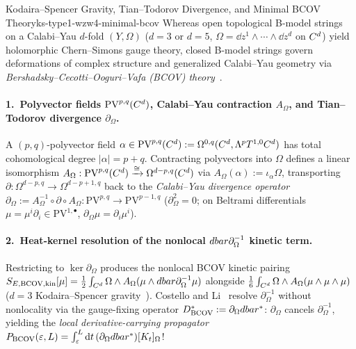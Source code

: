 \begin{zkmodule}{Kodaira--Spencer Gravity, Tian--Todorov Divergence, and Minimal BCOV Theory}{ks-type1-wzw4-minimal-bcov}
Whereas open topological B-model strings on a Calabi--Yau $d$-fold $(Y,\Omega)$ ($d=3$ or $d=5$, $\Omega = \dd z^1\wedge\cdots\wedge\dd z^d$ on $C^d$) yield holomorphic Chern--Simons gauge theory, closed B-model strings govern deformations of complex structure and generalized Calabi--Yau geometry via \emph{Bershadsky--Cecotti--Ooguri--Vafa (BCOV) theory}~\cite{BCOV94,CL19}.

\paragraph{1.\ Polyvector fields $\mathrm{PV}^{p,q}(C^d)$, Calabi--Yau contraction $A_\Omega$, and Tian--Todorov divergence $\partial_\Omega$.}
A $(p,q)$-polyvector field $\alpha \in \mathrm{PV}^{p,q}(C^d) := \Omega^{0,q}(C^d, \Lambda^p T^{1,0}C^d)$ has total cohomological degree $|\alpha| = p + q$. Contracting polyvectors into $\Omega$ defines a linear isomorphism $A_\Omega : \mathrm{PV}^{p,q}(C^d) \xrightarrow{\cong} \Omega^{d-p,q}(C^d)$ via $A_\Omega(\alpha) := \iota_\alpha\Omega$, transporting $\partial : \Omega^{d-p,q} \to \Omega^{d-p+1,q}$ back to the \emph{Calabi--Yau divergence operator} $\partial_\Omega := A_\Omega^{-1}\circ\partial\circ A_\Omega : \mathrm{PV}^{p,q} \to \mathrm{PV}^{p-1,q}$ ($\partial_\Omega^2 = 0$; on Beltrami differentials $\mu = \mu^i\partial_i \in \mathrm{PV}^{1,\bullet}$, $\partial_\Omega\mu = \partial_i\mu^i$).

\paragraph{2.\ Heat-kernel resolution of the nonlocal $dbar\partial_\Omega^{-1}$ kinetic term.}
Restricting to $\ker\partial_\Omega$ produces the nonlocal BCOV kinetic pairing $S_{E,\mathrm{BCOV,kin}}[\mu] = \frac{1}{2}\int_{C^d}\Omega\wedge A_\Omega(\mu\wedge dbar\partial_\Omega^{-1}\mu)$ alongside $\frac{1}{6}\int_{C^d}\Omega\wedge A_\Omega(\mu\wedge\mu\wedge\mu)$ ($d=3$ Kodaira--Spencer gravity~\cite{BCOV94}). Costello and Li~\cite{CL19} resolve $\partial_\Omega^{-1}$ without nonlocality via the gauge-fixing operator $D^*_{\mathrm{BCOV}} := \partial_\Omega dbar^*$: $\partial_\Omega$ cancels $\partial_\Omega^{-1}$, yielding the \emph{local derivative-carrying propagator} $P_{\mathrm{BCOV}}(\varepsilon,L) = \int_\varepsilon^L \mathrm{d} t\,(\partial_\Omega dbar^*)[K_t]_\Omega$!


\end{zkmodule}
